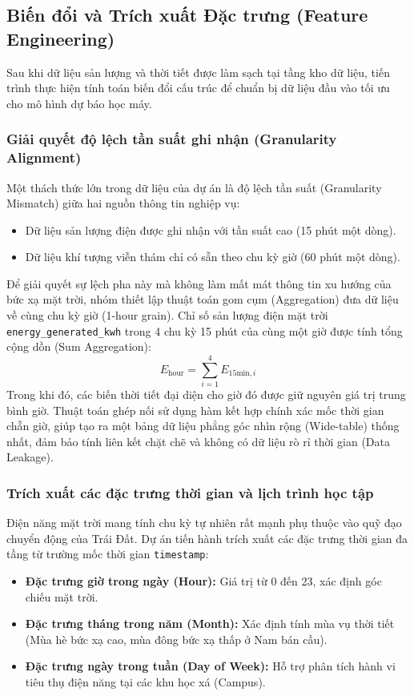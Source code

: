 \documentclass[12pt,a4paper]{article}
\begin{document}
\subsection{Biến đổi và Trích xuất Đặc trưng (Feature Engineering)}
\label{sec:transformation}

Sau khi dữ liệu sản lượng và thời tiết được làm sạch tại tầng kho dữ liệu, tiến trình thực hiện tính toán biến đổi cấu trúc để chuẩn bị dữ liệu đầu vào tối ưu cho mô hình dự báo học máy.

\subsubsection{Giải quyết độ lệch tần suất ghi nhận (Granularity Alignment)}
Một thách thức lớn trong dữ liệu của dự án là độ lệch tần suất (Granularity Mismatch) giữa hai nguồn thông tin nghiệp vụ:
\begin{itemize}
    \item Dữ liệu sản lượng điện được ghi nhận với tần suất cao (15 phút một dòng).
    \item Dữ liệu khí tượng viễn thám chỉ có sẵn theo chu kỳ giờ (60 phút một dòng).
\end{itemize}

Để giải quyết sự lệch pha này mà không làm mất mát thông tin xu hướng của bức xạ mặt trời, nhóm thiết lập thuật toán gom cụm (Aggregation) đưa dữ liệu về cùng chu kỳ giờ (1-hour grain). Chỉ số sản lượng điện mặt trời \texttt{energy\_generated\_kwh} trong 4 chu kỳ 15 phút của cùng một giờ được tính tổng cộng dồn (Sum Aggregation):
\begin{equation}
E_{\text{hour}} = \sum_{i=1}^{4} E_{15\text{min}, i}
\end{equation}
Trong khi đó, các biến thời tiết đại diện cho giờ đó được giữ nguyên giá trị trung bình giờ. Thuật toán ghép nối sử dụng hàm kết hợp chính xác mốc thời gian chẵn giờ, giúp tạo ra một bảng dữ liệu phẳng góc nhìn rộng (Wide-table) thống nhất, đảm bảo tính liên kết chặt chẽ và không có dữ liệu rò rỉ thời gian (Data Leakage).

\subsubsection{Trích xuất các đặc trưng thời gian và lịch trình học tập}
Điện năng mặt trời mang tính chu kỳ tự nhiên rất mạnh phụ thuộc vào quỹ đạo chuyển động của Trái Đất. Dự án tiến hành trích xuất các đặc trưng thời gian đa tầng từ trường mốc thời gian \texttt{timestamp}:
\begin{itemize}
    \item \textbf{Đặc trưng giờ trong ngày (Hour):} Giá trị từ 0 đến 23, xác định góc chiếu mặt trời.
    \item \textbf{Đặc trưng tháng trong năm (Month):} Xác định tính mùa vụ thời tiết (Mùa hè bức xạ cao, mùa đông bức xạ thấp ở Nam bán cầu).
    \item \textbf{Đặc trưng ngày trong tuần (Day of Week):} Hỗ trợ phân tích hành vi tiêu thụ điện năng tại các khu học xá (Campus).
\end{itemize}
\end{document}
